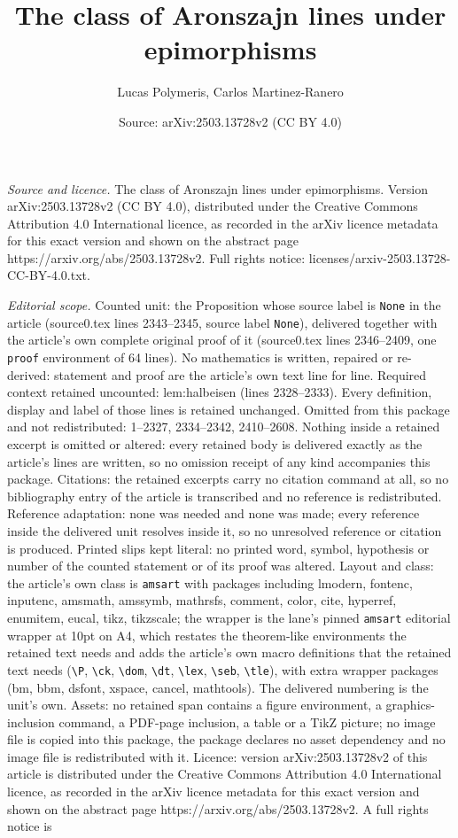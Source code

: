 \documentclass[10pt,a4paper]{amsart}
\title[The class of Aronszajn lines under epimorphisms]{The class of Aronszajn lines under epimorphisms}
\author{Lucas Polymeris, Carlos Martinez-Ranero}
\date{Source: arXiv:2503.13728v2 (CC BY 4.0)}
\begin{document}
\maketitle

\noindent\emph{Source and licence.} The class of Aronszajn lines under epimorphisms. Version arXiv:2503.13728v2 (CC BY 4.0), distributed under the Creative Commons Attribution 4.0 International licence, as recorded in the arXiv licence metadata for this exact version and shown on the abstract page https://arxiv.org/abs/2503.13728v2. Full rights notice: licenses/arxiv-2503.13728-CC-BY-4.0.txt.\par\smallskip

\noindent\textit{Editorial scope.} Counted unit: the Proposition whose source label is \texttt{None} in the article (source0.tex lines 2343--2345, source label \texttt{None}), delivered together with the article's own complete original proof of it (source0.tex lines 2346--2409, one \texttt{proof} environment of 64 lines). No mathematics is written, repaired or re-derived: statement and proof are the article's own text line for line. Required context retained uncounted: lem:halbeisen (lines 2328--2333). Every definition, display and label of those lines is retained unchanged. Omitted from this package and not redistributed: 1--2327, 2334--2342, 2410--2608. Nothing inside a retained excerpt is omitted or altered: every retained body is delivered exactly as the article's lines are written, so no omission receipt of any kind accompanies this package. Citations: the retained excerpts carry no citation command at all, so no bibliography entry of the article is transcribed and no reference is redistributed. Reference adaptation: none was needed and none was made; every reference inside the delivered unit resolves inside it, so no unresolved reference or citation is produced. Printed slips kept literal: no printed word, symbol, hypothesis or number of the counted statement or of its proof was altered. Layout and class: the article's own class is \texttt{amsart} with packages including lmodern, fontenc, inputenc, amsmath, amssymb, mathrsfs, comment, color, cite, hyperref, enumitem, eucal, tikz, tikzscale; the wrapper is the lane's pinned \texttt{amsart} editorial wrapper at 10pt on A4, which restates the theorem-like environments the retained text needs and adds the article's own macro definitions that the retained text needs (\texttt{\textbackslash P}, \texttt{\textbackslash ck}, \texttt{\textbackslash dom}, \texttt{\textbackslash dt}, \texttt{\textbackslash lex}, \texttt{\textbackslash seb}, \texttt{\textbackslash tle}), with extra wrapper packages (bm, bbm, dsfont, xspace, cancel, mathtools). The delivered numbering is the unit's own. Assets: no retained span contains a figure environment, a graphics-inclusion command, a PDF-page inclusion, a table or a TikZ picture; no image file is copied into this package, the package declares no asset dependency and no image file is redistributed with it. Licence: version arXiv:2503.13728v2 of this article is distributed under the Creative Commons Attribution 4.0 International licence, as recorded in the arXiv licence metadata for this exact version and shown on the abstract page https://arxiv.org/abs/2503.13728v2. A full rights notice is 
\end{document}
